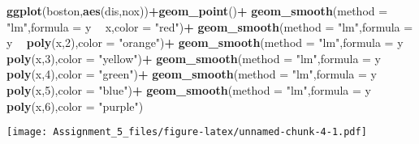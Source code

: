 \documentclass[]{article}
\newenvironment{Shaded}{\begin{snugshade}}{\end{snugshade}}
\newcommand{\KeywordTok}[1]{\textcolor[rgb]{0.13,0.29,0.53}{\textbf{#1}}}
\newcommand{\DataTypeTok}[1]{\textcolor[rgb]{0.13,0.29,0.53}{#1}}
\newcommand{\DecValTok}[1]{\textcolor[rgb]{0.00,0.00,0.81}{#1}}
\newcommand{\StringTok}[1]{\textcolor[rgb]{0.31,0.60,0.02}{#1}}
\newcommand{\OtherTok}[1]{\textcolor[rgb]{0.56,0.35,0.01}{#1}}
\newcommand{\ControlFlowTok}[1]{\textcolor[rgb]{0.13,0.29,0.53}{\textbf{#1}}}
\newcommand{\OperatorTok}[1]{\textcolor[rgb]{0.81,0.36,0.00}{\textbf{#1}}}
\newcommand{\NormalTok}[1]{#1}
\begin{document}
\begin{Shaded}
\begin{Highlighting}[]
\KeywordTok{ggplot}\NormalTok{(boston,}\KeywordTok{aes}\NormalTok{(dis,nox))}\OperatorTok{+}\KeywordTok{geom_point}\NormalTok{()}\OperatorTok{+}
\StringTok{  }\KeywordTok{geom_smooth}\NormalTok{(}\DataTypeTok{method =} \StringTok{"lm"}\NormalTok{,}\DataTypeTok{formula =}\NormalTok{ y }\OperatorTok{~}\StringTok{ }\NormalTok{x,}\DataTypeTok{color =} \StringTok{"red"}\NormalTok{)}\OperatorTok{+}
\StringTok{  }\KeywordTok{geom_smooth}\NormalTok{(}\DataTypeTok{method =} \StringTok{"lm"}\NormalTok{,}\DataTypeTok{formula =}\NormalTok{ y }\OperatorTok{~}\StringTok{ }\KeywordTok{poly}\NormalTok{(x,}\DecValTok{2}\NormalTok{),}\DataTypeTok{color =} \StringTok{"orange"}\NormalTok{)}\OperatorTok{+}
\StringTok{  }\KeywordTok{geom_smooth}\NormalTok{(}\DataTypeTok{method =} \StringTok{"lm"}\NormalTok{,}\DataTypeTok{formula =}\NormalTok{ y }\OperatorTok{~}\StringTok{ }\KeywordTok{poly}\NormalTok{(x,}\DecValTok{3}\NormalTok{),}\DataTypeTok{color =} \StringTok{"yellow"}\NormalTok{)}\OperatorTok{+}
\StringTok{  }\KeywordTok{geom_smooth}\NormalTok{(}\DataTypeTok{method =} \StringTok{"lm"}\NormalTok{,}\DataTypeTok{formula =}\NormalTok{ y }\OperatorTok{~}\StringTok{ }\KeywordTok{poly}\NormalTok{(x,}\DecValTok{4}\NormalTok{),}\DataTypeTok{color =} \StringTok{"green"}\NormalTok{)}\OperatorTok{+}
\StringTok{  }\KeywordTok{geom_smooth}\NormalTok{(}\DataTypeTok{method =} \StringTok{"lm"}\NormalTok{,}\DataTypeTok{formula =}\NormalTok{ y }\OperatorTok{~}\StringTok{ }\KeywordTok{poly}\NormalTok{(x,}\DecValTok{5}\NormalTok{),}\DataTypeTok{color =} \StringTok{"blue"}\NormalTok{)}\OperatorTok{+}
\StringTok{  }\KeywordTok{geom_smooth}\NormalTok{(}\DataTypeTok{method =} \StringTok{"lm"}\NormalTok{,}\DataTypeTok{formula =}\NormalTok{ y }\OperatorTok{~}\StringTok{ }\KeywordTok{poly}\NormalTok{(x,}\DecValTok{6}\NormalTok{),}\DataTypeTok{color =} \StringTok{"purple"}\NormalTok{)}
\end{Highlighting}
\end{Shaded}

\texttt{[image: Assignment\_5\_files/figure-latex/unnamed-chunk-4-1.pdf]}

\begin{Shaded}
\end{Shaded}
\end{document}
